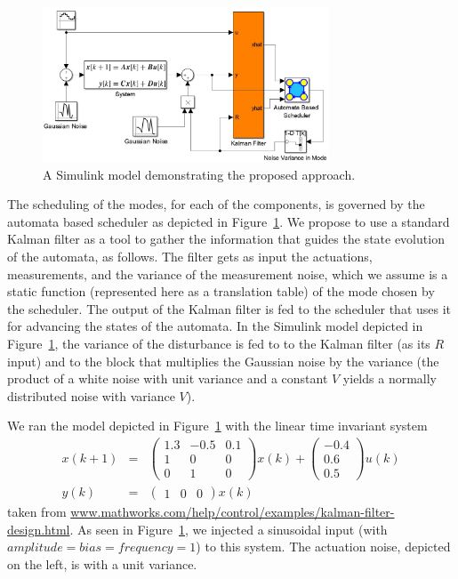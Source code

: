 \documentclass{sig-alternate-ipsn13}
\begin{document}
\begin{figure}%
	\centerline{\includegraphics[width=85mm]{SimulinkModel.jpg}}
	\caption{A Simulink model demonstrating the proposed approach.}
	\label{fig:simulink}
\end{figure}

The scheduling of the modes, for each of the components, is governed by the automata based scheduler as depicted in Figure~\ref{fig:simulink}. We propose to use a standard Kalman filter as a tool to gather the information that guides the state evolution of the automata, as follows. The filter gets as input the actuations,  measurements, and the variance of the measurement noise, which we assume is a static function (represented here as a translation table) of the mode chosen by the scheduler. The output of the Kalman filter is fed to the scheduler that uses it for advancing the states of the automata. In the Simulink model depicted in Figure~\ref{fig:simulink}, the variance of the disturbance is fed to to the Kalman filter (as its $R$ input) and to the block that multiplies the Gaussian noise by the variance (the product of a white noise with unit variance and a constant $V$ yields a normally distributed noise with variance $V$).

We ran the model depicted in Figure~\ref{fig:simulink} with the linear time invariant system
\begin{eqnarray*}
x(k+1) &=& \begin{pmatrix}
	1.3  & -0.5  & 0.1 \\
	1    & 0     & 0 \\
	0    & 1     & 0
\end{pmatrix}x(k)+ 
\begin{pmatrix}
-0.4 \\
0.6\\
0.5\end{pmatrix} u(k) \\
y(k)&=& \begin{pmatrix}1 & 0 &0\end{pmatrix}x(k)
\end{eqnarray*}
taken from \url{www.mathworks.com/help/control/examples/kalman-filter-design.html}. As seen in Figure~\ref{fig:simulink}, we injected a sinusoidal input (with $amplitude=bias=frequency=1$) to this system. 
The actuation noise, depicted on the left, is with a unit variance. 
\end{document}
